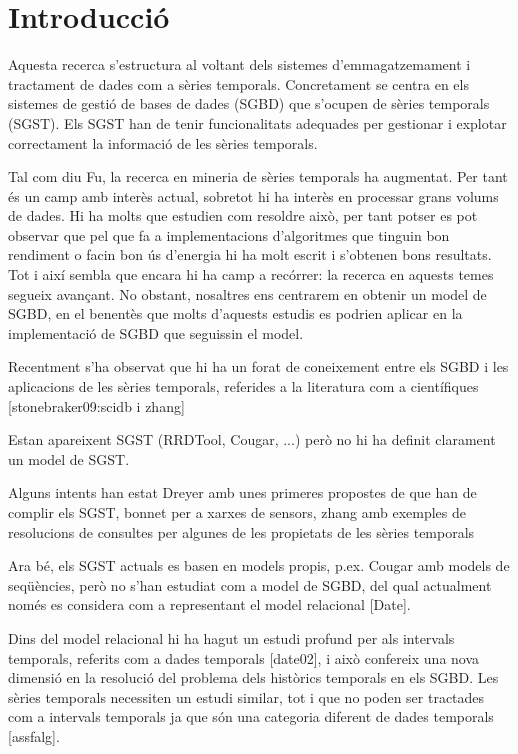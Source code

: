 \chapter{Introducció}




Aquesta recerca s'estructura al voltant dels sistemes
d'emmagatzemament i tractament de dades com a sèries temporals.
Concretament se centra en els sistemes de gestió de bases de dades
(SGBD) que s'ocupen de sèries temporals (SGST). Els SGST han de tenir  funcionalitats adequades per gestionar i
explotar correctament la informació de les sèries temporals.

Tal com diu Fu, la recerca en mineria de sèries temporals ha augmentat. Per tant és un camp amb interès actual, sobretot hi ha interès en processar grans volums de dades. Hi ha molts que estudien com resoldre això, per tant potser es pot observar que pel que fa a implementacions d'algoritmes que tinguin bon rendiment o facin bon ús d'energia hi ha molt escrit i s'obtenen bons resultats. Tot i així sembla que encara hi ha camp a recórrer: la recerca en aquests temes segueix avançant. No obstant, nosaltres ens centrarem en obtenir un model de SGBD, en el benentès que molts d'aquests estudis es podrien aplicar en la implementació de SGBD que seguissin el model.


Recentment s'ha observat que hi ha un forat de coneixement entre els SGBD i les aplicacions de les sèries temporals, referides a la literatura com a científiques [stonebraker09:scidb i zhang]


Estan apareixent SGST (RRDTool, Cougar, ...) però no hi ha definit clarament un model de SGST. 

Alguns intents han estat Dreyer amb unes primeres propostes de que han de complir els SGST, bonnet per a xarxes de sensors, zhang amb exemples de resolucions de consultes per algunes de les propietats de les sèries temporals

Ara bé, els SGST actuals es basen en models propis, p.ex. Cougar amb models de seqüències, però no s'han estudiat com a model de SGBD, del qual actualment només es considera com a representant el model relacional [Date]. 

Dins del model relacional hi ha hagut un estudi profund per als intervals temporals, referits com a dades temporals [date02], i això confereix una nova dimensió en la resolució del problema dels històrics temporals en els SGBD. Les sèries temporals necessiten un estudi similar, tot i que no poden ser tractades com a intervals temporals ja que són una categoria diferent de dades temporals [assfalg].



